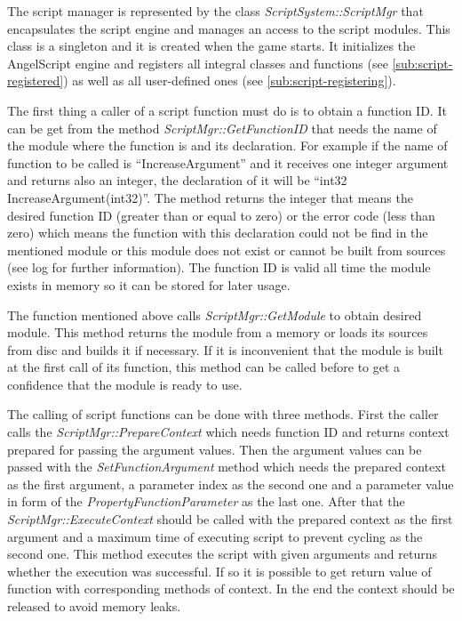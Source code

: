The script manager is represented by the class \emph{ScriptSystem::ScriptMgr} that encapsulates the script engine and manages an access to the script modules. This class is a singleton and it is created when the game starts. It initializes the AngelScript engine and registers all integral classes and functions (see \ref{sub:script-registered}) as well as all user-defined ones (see \ref{sub:script-registering}).

The first thing a caller of a script function must do is to obtain a function ID. It can be get from the method \emph{ScriptMgr::GetFunctionID} that needs the name of the module where the function is and its declaration. For example if the name of function to be called is ``IncreaseArgument'' and it receives one integer argument and returns also an integer, the declaration of it will be ``int32 IncreaseArgument(int32)''. The method returns the integer that means the desired function ID (greater than or equal to zero) or the error code (less than zero) which means the function with this declaration could not be find in the mentioned module or this module does not exist or cannot be built from sources (see log for further information). The function ID is valid all time the module exists in memory so it can be stored for later usage.

The function mentioned above calls \emph{ScriptMgr::GetModule} to obtain desired module. This method returns the module from a memory or loads its sources from disc and builds it if necessary. If it is inconvenient that the module is built at the first call of its function, this method can be called before to get a confidence that the module is ready to use.

The calling of script functions can be done with three methods. First the caller calls the \emph{ScriptMgr::PrepareContext} which needs function ID and returns context prepared for passing the argument values. Then the argument values can be passed with the \emph{SetFunctionArgument} method which needs the prepared context as the first argument, a parameter index as the second one and a parameter value in form of the \emph{PropertyFunctionParameter} as the last one. After that the \emph{ScriptMgr::ExecuteContext} should be called with the prepared context as the first argument and a maximum time of executing script to prevent cycling as the second one. This method executes the script with given arguments and returns whether the execution was successful. If so it is possible to get return value of function with corresponding methods of context. In the end the context should be released to avoid memory leaks.

